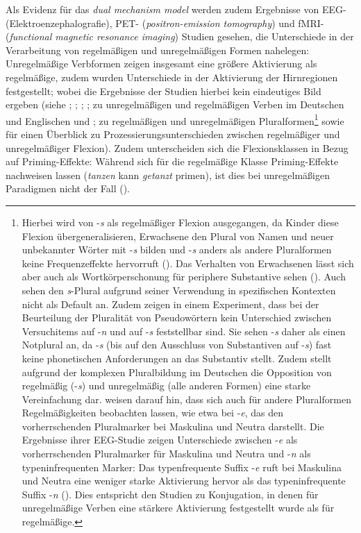 Als Evidenz für das \textit{dual mechanism model} werden zudem Ergebnisse von EEG- (Elektroenzephalografie), PET- (\textit{positron-emission tomography}) und fMRI- (\textit{functional magnetic resonance imaging}) Studien gesehen, die Unterschiede in der Verarbeitung von regelmäßigen und unregelmäßigen Formen nahelegen: Unregelmäßige Verbformen zeigen insgesamt eine größere Aktivierung als regelmäßige, zudem wurden Unterschiede in der Aktivierung der Hirnregionen festgestellt; wobei die Ergebnisse der Studien hierbei kein eindeutiges Bild ergeben (siehe  \textcite{Jaeger.1996}; \textcite{Indefrey.1997};  \textcite{Penke.1997}; \textcite{Beretta.2003}; \textcite{Krott.2013} zu unregelmäßigen und regelmäßigen Verben im Deutschen und Englischen und \textcite{Weyerts.1997}; \textcite{Bartke.2005} zu regelmäßigen und unregelmäßigen Pluralformen\footnote{Hierbei wird von -\textit{s} als regelmäßiger Flexion ausgegangen, da Kinder diese Flexion übergeneralisieren, Erwachsene den Plural von Namen und neuer unbekannter Wörter mit -\textit{s} bilden und -\textit{s} anders als andere Pluralformen keine Frequenzeffekte hervorruft (\cite[958]{Weyerts.1997}). Das Verhalten von Erwachsenen lässt sich aber auch als Wortkörperschonung für periphere Substantive sehen (\cite[150--154]{Ackermann.2017}). Auch \textcite[79]{Kopcke.2017} sehen den \textit{s}-Plural aufgrund seiner Verwendung in spezifischen Kontexten nicht als Default an. Zudem zeigen \textcite[19--21]{Kopcke.2021} in einem Experiment, dass bei der Beurteilung der Pluralität von Pseudowörtern kein Unterschied zwischen Versuchitems auf -\textit{n} und auf -\textit{s} feststellbar sind. Sie sehen -\textit{s} daher als einen Notplural an, da -\textit{s} (bis auf den Ausschluss von Substantiven auf -\textit{s}) fast keine phonetischen Anforderungen an das Substantiv stellt. Zudem stellt aufgrund der komplexen Pluralbildung im Deutschen die Opposition von regelmäßig (-\textit{s}) und unregelmäßig (alle anderen Formen) eine starke Vereinfachung dar. \textcite[33--35]{Bartke.2005} weisen darauf hin, dass sich auch für andere Pluralformen Regelmäßigkeiten beobachten lassen, wie etwa bei -\textit{e}, das den vorherrschenden Pluralmarker bei Maskulina und Neutra darstellt. Die Ergebnisse ihrer EEG-Studie zeigen Unterschiede zwischen -\textit{e} als vorherrschenden Pluralmarker für Maskulina und Neutra und -\textit{n} als typeninfrequenten Marker: Das typenfrequente Suffix -\textit{e} ruft bei Maskulina und Neutra eine weniger starke Aktivierung hervor als das typeninfrequente Suffix -\textit{n} (\cite[40--47]{Bartke.2005}). Dies entspricht den Studien zu Konjugation, in denen für unregelmäßige Verben eine stärkere Aktivierung festgestellt wurde als für regelmäßige.} sowie \textcite[47--68]{BornkesselSchlesewsky.2009} für einen Überblick zu Prozessierungsunterschieden zwischen regelmäßiger und unregelmäßiger Flexion). Zudem unterscheiden sich die Flexionsklassen in Bezug auf Priming-Effekte: Während sich für die regelmäßige Klasse Priming-Effekte nachweisen lassen (\textit{tanzen} kann \textit{getanzt} primen), ist dies bei unregelmäßigen Paradigmen nicht der Fall (\cite[47--68]{BornkesselSchlesewsky.2009}).


